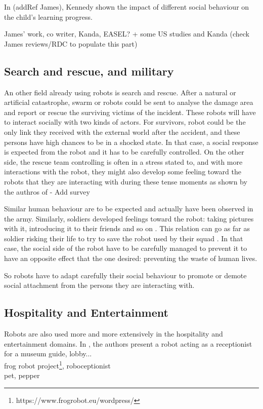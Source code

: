 	In (addRef James), Kennedy shown the impact of different social behaviour on the child's learning progress. 
	
	
		James' work, co writer, Kanda, EASEL? + some US studies and Kanda (check James reviews/RDC to populate this part)
	
	\subsection{Search and rescue, and military} 
	
	An other field already using robots is search and rescue. After a natural or artificial catastrophe, swarm or robots could be sent to analyse the damage area and report or rescue the surviving victims of the incident. These robots will have to interact socially with two kinds of actors. For survivors, robot could be the only link they received with the external world after the accident, and these persons have high chances to be in a shocked state. In that case, a  social response is expected from the robot and it has to be carefully controlled. On the other side, the rescue team controlling is often in a stress stated to, and with more interactions with the robot, they might also develop some feeling toward the robots that they are interacting with during these tense moments as shown by the authros of \cite{fincannon2004evidence} - Add survey
	
	Similar human behaviour are to be expected and actually have been observed in the army. Similarly, soldiers developed feelings toward the robot: taking pictures with it, introducing it to their friends and so on \cite{garreau2007bots}. This relation can go as far as soldier risking their life to try to save the robot used by their squad \cite{singer2009wired}. In that case, the social side of the robot have to be carefully managed to prevent it to have an opposite effect that the one desired: preventing the waste of human lives.
	
	So robots have to adapt carefully their social behaviour to promote or demote social attachment from the persons they are interacting with.
	
	\subsection{Hospitality and Entertainment} 
	
	Robots are also used more and more extensively in the hospitality and entertainment domains. In \cite{gockley2005designing}, the authors present a robot acting as a receptionist for a 
		museum guide, lobby...\\
		frog robot project\footnote{https://www.frogrobot.eu/wordpress/}, roboceptionist \\
		pet, pepper\\
	
